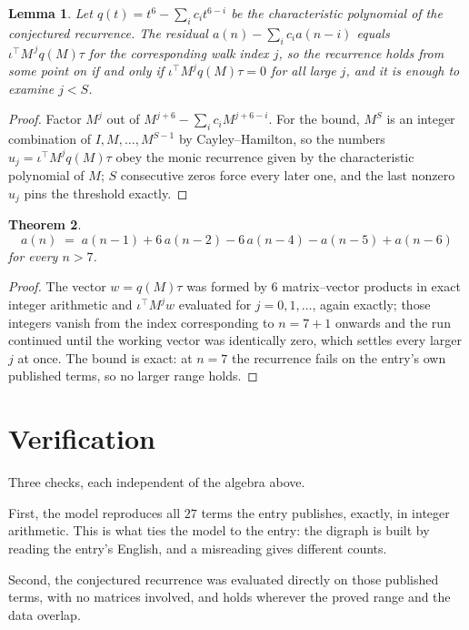 \documentclass[11pt,a4paper]{article}
\theoremstyle{plain}
\newtheorem{theorem}{Theorem}
\newtheorem{lemma}[theorem]{Lemma}
\theoremstyle{definition}
\begin{document}
\begin{lemma}\label{lem:crit}
Let $q(t)=t^{6}-\sum_i c_it^{6-i}$ be the characteristic polynomial of the
conjectured recurrence. The residual $a(n)-\sum_ic_ia(n-i)$ equals
$\iota^{\!\top}M^{\,j}q(M)\tau$ for the corresponding walk index $j$, so the recurrence
holds from some point on if and only if $\iota^{\!\top}M^{j}q(M)\tau=0$ for all large $j$,
and it is enough to examine $j<S$.
\end{lemma}

\begin{proof}
Factor $M^{j}$ out of $M^{j+6}-\sum_ic_iM^{j+6-i}$. For the bound, $M^{S}$
is an integer combination of $I,M,\dots,M^{S-1}$ by Cayley--Hamilton, so the numbers
$u_j=\iota^{\!\top}M^{j}q(M)\tau$ obey the monic recurrence given by the characteristic
polynomial of $M$; $S$ consecutive zeros force every later one, and the last nonzero $u_j$
pins the threshold exactly.
\end{proof}

\begin{theorem}
\[
a(n)\;=\;a(n-1) + 6\,a(n-2) - 6\,a(n-4) - a(n-5) + a(n-6)
\]
for every $n>7$.
\end{theorem}

\begin{proof}
The vector $w=q(M)\tau$ was formed by $6$ matrix--vector products in exact integer
arithmetic and $\iota^{\!\top}M^{j}w$ evaluated for $j=0,1,\dots$, again exactly; those
integers vanish from the index corresponding to $n=7+1$ onwards and the run continued
until the working vector was identically zero, which settles every larger $j$ at once. The bound is exact: at $n=7$ the recurrence fails on the entry's own published terms, so no larger range holds.
\end{proof}

\section{Verification}

Three checks, each independent of the algebra above.

First, the model reproduces all $27$ terms the entry publishes, exactly, in integer
arithmetic. This is what ties the model to the entry: the digraph is built by reading the
entry's English, and a misreading gives different counts.

Second, the conjectured recurrence was evaluated directly on those published terms, with no
matrices involved, and holds wherever the proved range and the data overlap.
\end{document}
